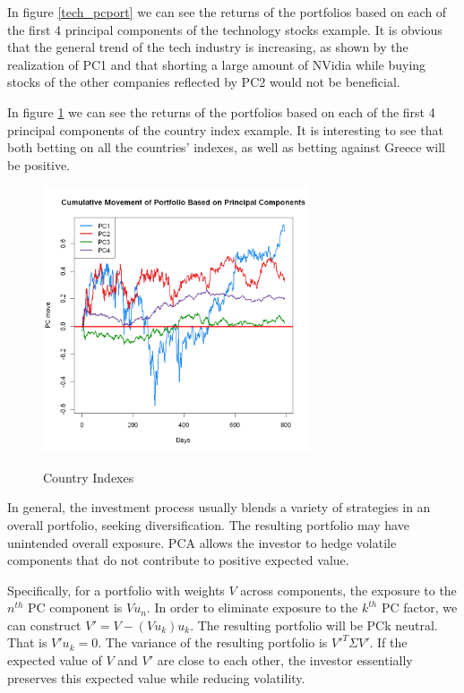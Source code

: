 \documentclass{article}
\begin{document}
 
In figure \ref{tech_pcport} we can see the returns of the portfolios based on each of the first 4 principal components of the technology stocks example. It is obvious that the general trend of the tech industry is increasing, as shown by the realization of PC1 and that shorting a large amount of NVidia while buying stocks of the other companies reflected by PC2 would not be beneficial.
\\\par
In figure \ref{index_pcport} we can see the returns of the portfolios based on each of the first 4 principal components of the country index example. It is interesting to see that both betting on all the countries' indexes, as well as betting against Greece will be positive.

\begin{figure}[H]
    \caption{Country Indexes}
    \centering
    \includegraphics[width=0.7\textwidth]{index_PCport.png}
    \label{index_pcport}
\end{figure}

In general, the investment process usually blends a variety of strategies in an overall portfolio, seeking diversification. The resulting portfolio may have unintended overall exposure. PCA allows the investor to hedge volatile components that do not contribute to positive expected value.

Specifically, for a portfolio with weights $V$ across components, the exposure to the $n^{th}$ PC component is $Vu_{n}$. In order to eliminate exposure to the $k^{th}$ PC factor, we can construct $V'=V-(Vu_k)u_k$. The resulting portfolio will be PCk neutral. That is $V'u_k=0$. The variance of the resulting portfolio is $V'^{T}\Sigma V'$. If the expected value of $V$ and $V'$ are close to each other, the investor essentially preserves this expected value while reducing volatility.
\end{document}
